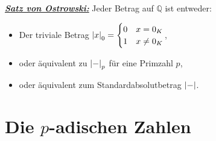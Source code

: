 \documentclass{report}
\newcommand{\tbf}[1]{\textbf{#1}}
\newcommand{\ul}[1]{\underline{#1}}
\newcommand{\theoremname}[1]{\emph{\tbf{\ul{#1}}}}
\newcommand{\bQ}{\mathbb{Q}}
\begin{document}
	\begin{proposition}
		\theoremname{Satz von Ostrowski:} Jeder Betrag auf $\bQ$ ist entweder:
		\begin{itemize}
			\item Der triviale Betrag $\abs{x}_0 = 
			\begin{cases}
				0 & x = 0_K\\
				1 & x \neq 0_K\\
			\end{cases}$, 
			\item oder äquivalent zu $\abs{-}_p$ für eine Primzahl $p$, 
			\item oder äquivalent zum Standardabsolutbetrag $\abs{-}$.
		\end{itemize} 
	\end{proposition}
	\chapter{Die $p$-adischen Zahlen}
\end{document}
